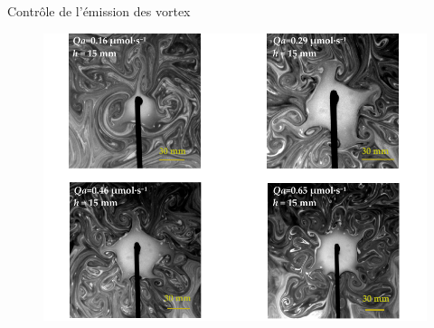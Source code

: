 \documentclass[aspectratio=169,10pt]{beamer}
\begin{document}
\begin{frame}{Contrôle de l'émission des vortex}
  \begin{figure}
      \centering
      
      \includegraphics[scale=.7]{./figures/Instabilite.pdf}
  \end{figure}
\end{frame} 
\end{document}
